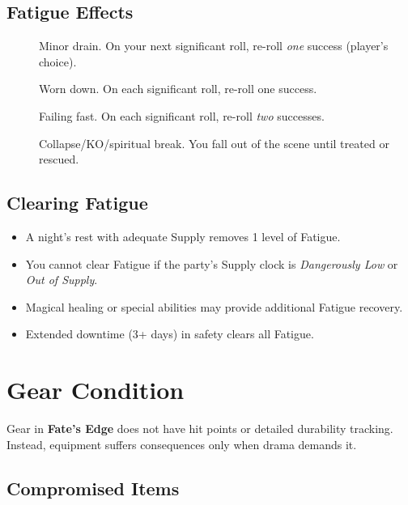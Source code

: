 \subsection{Fatigue Effects}
\label{subsec:fatigue-effects}

\begin{description}
\item[] Minor drain. On your next significant roll, re-roll \emph{one} success (player's choice). 
\item[] Worn down. On each significant roll, re-roll one success.
\item[] Failing fast. On each significant roll, re-roll \emph{two} successes.
\item[] Collapse/KO/spiritual break. You fall out of the scene until treated or rescued.
\end{description}

\subsection{Clearing Fatigue}
\label{subsec:clearing-fatigue}

\begin{itemize}
\item A night's rest with adequate Supply removes 1 level of Fatigue.
\item You cannot clear Fatigue if the party's Supply clock is \emph{Dangerously Low} or \emph{Out of Supply}. 
\item Magical healing or special abilities may provide additional Fatigue recovery. 
\item Extended downtime (3+ days) in safety clears all Fatigue. 
\end{itemize}

\section{Gear Condition}
\label{sec:gear-condition}

Gear in \textbf{Fate's Edge} does not have hit points or detailed durability tracking. Instead, equipment suffers consequences only when drama demands it. 

\subsection{Compromised Items}
\label{subsec:compromised-gear}

